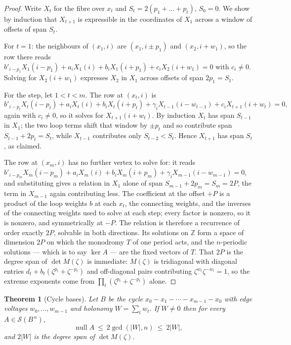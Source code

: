 \documentclass[11pt]{article}
\newtheorem{theorem}{Theorem}
\theoremstyle{definition}
\begin{document}
\begin{proof}
Write $X_t$ for the fibre over $x_t$ and $S_t=2(p_1+\dots+p_t)$, $S_0=0$. We
show by induction that $X_{t+1}$ is expressible in the coordinates of $X_1$
across a window of offsets of span $S_t$.

For $t=1$: the neighbours of $(x_1,i)$ are $(x_1,i\pm p_1)$ and $(x_2,i+w_1)$,
so the row there reads
$b'_{i-p_1}X_1(i-p_1)+a_iX_1(i)+b_iX_1(i+p_1)+c_iX_2(i+w_1)=0$ with $c_i\ne0$.
Solving for $X_2(i+w_1)$ expresses $X_2$ in $X_1$ across offsets of span
$2p_1=S_1$.

For the step, let $1<t<m$. The row at $(x_t,i)$ is
\[
  b'_{i-p_t}X_t(i-p_t)+a_iX_t(i)+b_iX_t(i+p_t)
  +\gamma_iX_{t-1}(i-w_{t-1})+c_iX_{t+1}(i+w_t)=0,
\]
again with $c_i\ne0$, so it solves for $X_{t+1}(i+w_t)$. By induction $X_t$ has
span $S_{t-1}$ in $X_1$; the two loop terms shift that window by $\pm p_t$ and
so contribute span $S_{t-1}+2p_t=S_t$, while $X_{t-1}$ contributes only
$S_{t-2}<S_t$. Hence $X_{t+1}$ has span $S_t$, as claimed.

The row at $(x_m,i)$ has no further vertex to solve for: it reads
$b'_{i-p_m}X_m(i-p_m)+a_iX_m(i)+b_iX_m(i+p_m)+\gamma_iX_{m-1}(i-w_{m-1})=0$,
and substituting gives a relation in $X_1$ alone of span
$S_{m-1}+2p_m=S_m=2P$, the term in $X_{m-1}$ again contributing less. The
coefficient at the offset $+P$ is a product of the loop weights $b$ at each
$x_t$, the connecting weights, and the inverses of the connecting weights used
to solve at each step; every factor is nonzero, so it is nonzero, and
symmetrically at $-P$. The relation is therefore a recurrence of order exactly
$2P$, solvable in both directions. Its solutions on $\mathbb Z$ form a space of
dimension $2P$ on which the monodromy $T$ of one period acts, and the
$n$-periodic solutions --- which is to say $\ker A$ --- are the fixed vectors of
$T$. That $2P$ is the degree span of $\det M(\zeta)$ is immediate: $M(\zeta)$ is
tridiagonal with diagonal entries $d_t+b_t(\zeta^{p_t}+\zeta^{-p_t})$ and
off-diagonal pairs contributing $\zeta^{w_t}\zeta^{-w_t}=1$, so the extreme
exponents come from $\prod_t(\zeta^{p_t}+\zeta^{-p_t})$ alone.
\end{proof}

\begin{theorem}[Cycle bases]\label{thm:redcycle}
Let $B$ be the cycle $x_0\!-\!x_1\!-\!\cdots\!-\!x_{m-1}\!-\!x_0$ with edge
voltages $w_0,\dots,w_{m-1}$ and holonomy $W=\sum_t w_t$. If $W\ne0$ then for
every $A\in\mathcal S(B^{\,n})$,
\[
  \operatorname{null}A\ \le\ 2\gcd(|W|,n)\ \le\ 2|W| ,
\]
and $2|W|$ is the degree span of $\det M(\zeta)$.
\end{theorem}
\end{document}
